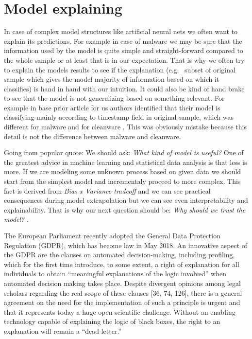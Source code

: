 \chapter{Model explaining}
In case of complex model structures like artificial neural nets we often want to explain its predictions. For example in case of malware we may be sure that the information used by the model is quite simple and straight-forward compared to the whole sample or at least that is in our expectation. That is why we often try to explain the models results to see if the explanation (e.g. \ subset of original sample which gives the model majority of information based on which it classifies) is hand in hand with our intuition. It could also be kind of hand brake to see that the model is not generalizing based on something relevant. For example in base prior article for us authors identified that their model is classifying mainly according to timestamp field in original sample, which was different for malware and for cleanware \cite{Pevny2020}. This was obviously mistake because this detail is not the difference between malware and cleanware.

Going from popular quote:   We should ask: \emph{What kind of model is useful?}
One of the greatest advice in machine learning and statistical data analysis is that less is more. If we are modeling some unknown process based on given data we should start from the simplest model and incrementaly proceed to more complex. This fact is derived from \emph{Bias x Variance tradeoff}  and we can see practical consequences during model extrapolation but we can see even interpretability and explainability. That is why our next question should be: \emph{Why should we trust the model?} \cite{Ribeiro2016}.


The European Parliament recently adopted the General Data Protection Regulation (GDPR),
which has become law in May 2018. An innovative aspect of the GDPR are the clauses on automated decision-making, including profiling, which for the first time introduce, to some extent, a right of explanation for all individuals to obtain “meaningful explanations of the logic involved”
when automated decision making takes place. Despite divergent opinions among legal scholars
regarding the real scope of these clauses [36, 74, 126], there is a general agreement on the need for
the implementation of such a principle is urgent and that it represents today a huge open scientific
challenge. Without an enabling technology capable of explaining the logic of black boxes, the right
to an explanation will remain a “dead letter.” \cite{Guidotti2018}

